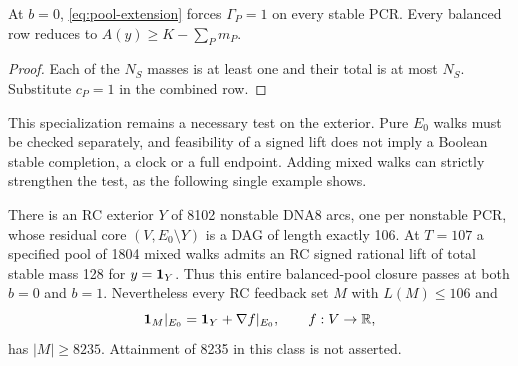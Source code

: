 \begin{corollary}\label{cor:mds-pool}
At $b=0$, \eqref{eq:pool-extension} forces $\Gamma_P=1$ on every stable PCR.
Every balanced row reduces to $A(y)\ge K-\sum_Pm_P$.
\end{corollary}
\begin{proof}
Each of the $N_S$ masses is at least one and their total is at most $N_S$.
Substitute $c_P=1$ in the combined row.
\end{proof}
This specialization remains a necessary test on the exterior. Pure $E_0$
walks must be checked separately, and feasibility of a signed lift does not
imply a Boolean stable completion, a clock or a full endpoint. Adding mixed
walks can strictly strengthen the test, as the following single example shows.

\begin{proposition}
\label{prop:core-pool-strictness}
There is an RC exterior $Y$ of 8102 nonstable DNA8 arcs, one per nonstable PCR,
whose residual core $(V,E_0\setminus Y)$ is a DAG of length exactly 106.
At $T=107$ a specified pool of 1804 mixed walks admits an RC signed rational
lift of total stable mass 128 for $y=\mathbf 1_Y$. Thus this entire balanced-pool
closure passes at both $b=0$ and $b=1$. Nevertheless every RC feedback set
$M$ with $L(M)\le106$ and
\[
 \mathbf 1_M|_{E_0}=\mathbf 1_Y+\nabla f|_{E_0},\qquad f:V\to\mathbb R,
\]
has $|M|\ge8235$. Attainment of 8235 in this class is not asserted.
\end{proposition}
